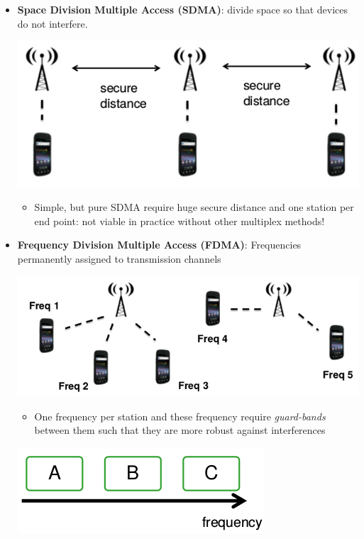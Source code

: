 \begin{itemize}
    \item \textbf{Space Division Multiple Access (SDMA)}: divide space
        so that devices do not interfere.
        \begin{center}
            \includegraphics[width=0.6\linewidth]{img/SDMA.png}
        \end{center}

        \begin{itemize}
            \item Simple, but pure SDMA require huge secure distance and one
                station per end point: not viable in practice without other
                multiplex methods!
        \end{itemize}

    \item \textbf{Frequency Division Multiple Access (FDMA)}:
        Frequencies permanently assigned to transmission channels
        \begin{center}
            \includegraphics[width=0.6\linewidth]{img/FDMA.png}
        \end{center}

        \begin{itemize}
            \item One frequency per station and these frequency require
                \textit{guard-bands} between them such that they are more robust
                against interferences
        \end{itemize}
        \begin{center}
            \includegraphics[width=0.3\linewidth]{img/guard.png}
        \end{center}


\end{itemize}
